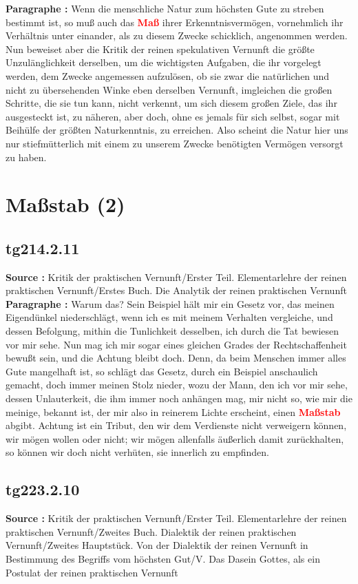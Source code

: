 \documentclass[a4paper,12pt,twoside]{book}
\newcommand{\match}[1]{\textcolor{red}{\textbf{#1}}}
\newcommand{\unnumberedsection}[1]{
	\section*{#1}
	\addcontentsline{toc}{section}{#1}
	\markright{#1}
}
\begin{document}
	\textbf{Paragraphe : }Wenn die menschliche Natur zum höchsten Gute zu streben bestimmt ist, so muß auch das \match{Maß} ihrer Erkenntnisvermögen, vornehmlich ihr Verhältnis unter einander, als zu diesem Zwecke schicklich, angenommen werden. Nun beweiset aber die Kritik der reinen spekulativen Vernunft die größte Unzulänglichkeit derselben, um die wichtigsten Aufgaben, die ihr vorgelegt werden, dem Zwecke angemessen aufzulösen, ob sie zwar die natürlichen und nicht zu übersehenden Winke eben derselben Vernunft, imgleichen die großen Schritte, die sie tun kann, nicht verkennt, um sich diesem großen Ziele, das ihr ausgesteckt ist, zu näheren, aber doch, ohne es jemals für sich selbst, sogar mit Beihülfe der größten Naturkenntnis, zu erreichen. Also scheint die Natur hier uns nur stiefmütterlich mit einem zu unserem Zwecke benötigten Vermögen versorgt zu haben. 
	
	\unnumberedsection{Maßstab (2)} 
	\subsection*{tg214.2.11} 
	\textbf{Source : }Kritik der praktischen Vernunft/Erster Teil. Elementarlehre der reinen praktischen Vernunft/Erstes Buch. Die Analytik der reinen praktischen Vernunft\\  
	
	\textbf{Paragraphe : }
	Warum das? Sein Beispiel hält mir ein Gesetz vor, das meinen Eigendünkel niederschlägt, wenn ich es mit meinem Verhalten vergleiche, und dessen Befolgung, mithin die Tunlichkeit desselben, ich durch die Tat bewiesen vor mir sehe. Nun mag ich mir sogar eines gleichen Grades der Rechtschaffenheit bewußt sein, und die Achtung bleibt doch. Denn, da beim Menschen immer alles Gute mangelhaft ist, so schlägt das Gesetz, durch ein Beispiel anschaulich gemacht, doch immer meinen Stolz nieder, wozu der Mann, den ich vor mir sehe, dessen Unlauterkeit, die ihm immer noch anhängen mag, mir nicht so, wie mir die meinige, bekannt ist, der mir also in reinerem Lichte erscheint, einen \match{Maßstab} abgibt. Achtung ist ein Tribut, den wir dem Verdienste nicht verweigern können, wir mögen wollen oder nicht; wir mögen allenfalls äußerlich damit zurückhalten, so können wir doch nicht verhüten, sie innerlich zu empfinden. 
	
	\subsection*{tg223.2.10} 
	\textbf{Source : }Kritik der praktischen Vernunft/Erster Teil. Elementarlehre der reinen praktischen Vernunft/Zweites Buch. Dialektik der reinen praktischen Vernunft/Zweites Hauptstück. Von der Dialektik der reinen Vernunft in Bestimmung des Begriffs vom höchsten Gut/V. Das Dasein Gottes, als ein Postulat der reinen praktischen Vernunft\\  
	
\end{document}
